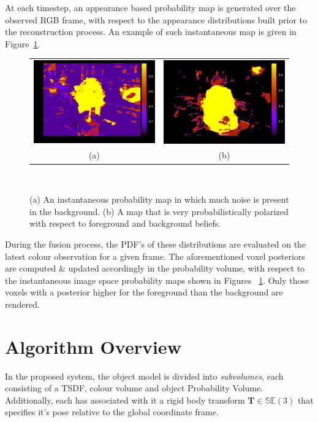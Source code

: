 At each timestep, an appearance based probability map is generated over the observed 
RGB frame, with respect to the appearance distributions built prior to the reconstruction 
process. An example of such instantaneous map is given in Figure~\ref{figure:probobj_prob_maps}.
\begin{figure}[!htbp]
  \centering
  \begin{tabular}{cc}
    \includegraphics[width=.4\linewidth]{figures/object_recon/prob/dino.png} &
    \includegraphics[width=.4\linewidth]{figures/object_recon/prob/rock.png} \\ 
    (a)  & (b) \\
  \end{tabular}
  \caption[Raw Foreground Probability Maps]
  {(a) An instantaneous probability map in which much noise is present in the background. 
  (b) A map that is very probabilistically polarized with respect to foreground and background 
  beliefs.}
~\label{figure:probobj_prob_maps}
\end{figure}

During the fusion process, the PDF's of these distributions are evaluated on the latest 
colour observation for a given frame. The aforementioned voxel posteriors are computed \& updated accordingly 
in the probability volume, with respect to the instantaneous image space probability maps shown in Figures
~\ref{figure:probobj_prob_maps}. Only those voxels with a posterior higher for the foreground than the 
background are rendered.


\section{Algorithm Overview}
In the proposed system, the object model is divided into \textit{subvolumes}, 
each consisting of a TSDF, colour volume and object Probability Volume. 
Additionally, each has associated with it a rigid body transform 
\(\bm{T} \in \mathbb{SE}(3)\) that specifies it's pose relative to the global 
coordinate frame.


